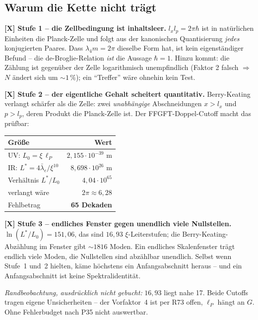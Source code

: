 \subsection{Warum die Kette nicht tr\"agt}

\textbf{[X] Stufe 1 -- die Zellbedingung ist inhaltsleer.}
$l_x l_p = 2\pi\hbar$ ist in nat\"urlichen Einheiten die Planck-Zelle
und folgt aus der kanonischen Quantisierung \emph{jedes} konjugierten
Paares. Dass $\lambda_4 m = 2\pi$ dieselbe Form hat, ist kein
eigenst\"andiger Befund -- die de-Broglie-Relation \emph{ist} die
Aussage $\hbar = 1$. Hinzu kommt: die Z\"ahlung ist gegen\"uber der
Zelle logarithmisch unempfindlich (Faktor 2 falsch $\Rightarrow$ $N$
\"andert sich um ${\sim}1\,\%$); ein \enquote{Treffer} w\"are ohnehin
kein Test.

\textbf{[X] Stufe 2 -- der eigentliche Gehalt scheitert quantitativ.}
Berry-Keating verlangt sch\"arfer als die Zelle: zwei \emph{unabh\"angige}
Abschneidungen $x > l_x$ und $p > l_p$, deren Produkt die Planck-Zelle
ist. Der FFGFT-Doppel-Cutoff macht das pr\"ufbar:

\begin{center}
\begin{tabular}{lr}
\toprule
Gr\"o\ss e & Wert \\
\midrule
UV: $L_0 = \xi\,\ell_P$ & $2{,}155\cdot10^{-39}$ m \\
IR: $L^* = 4\bar\lambda_e/\xi^{10}$ & $8{,}698\cdot10^{26}$ m \\
Verh\"altnis $L^*/L_0$ & $4{,}04\cdot10^{65}$ \\
verlangt w\"are & $2\pi \approx 6{,}28$ \\
\midrule
Fehlbetrag & \textbf{65 Dekaden} \\
\bottomrule
\end{tabular}
\end{center}

\textbf{[X] Stufe 3 -- endliches Fenster gegen unendlich viele
Nullstellen.} $\ln(L^*/L_0) = 151{,}06$, das sind $16{,}93$
$\xi$-Leiterstufen; die Berry-Keating-Abz\"ahlung im Fenster gibt
${\sim}1816$ Moden. Ein endliches Skalenfenster tr\"agt endlich viele
Moden, die Nullstellen sind abz\"ahlbar unendlich. Selbst wenn Stufe~1
und~2 hielten, k\"ame h\"ochstens ein Anfangsabschnitt heraus -- und ein
Anfangsabschnitt ist keine Spektralidentit\"at.

\emph{Randbeobachtung, ausdr\"ucklich nicht gebucht:} $16{,}93$ liegt
nahe 17. Beide Cutoffs tragen eigene Unsicherheiten -- der Vorfaktor~4
ist per R73 offen, $\ell_P$ h\"angt an $G$. Ohne Fehlerbudget nach P35
nicht auswertbar.

